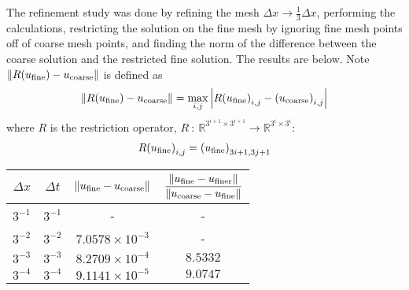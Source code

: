 \documentclass{article} %
\theoremstyle{plain}
\newcommand{\Dx}{\Delta x}
\newcommand{\Dt}{\Delta t}
\numberwithin{equation}{section} %
\numberwithin{figure}{section} %
\numberwithin{table}{section} %
\begin{document}
\begin{enumerate}[\ \ (a)]
\begin{figure}[ht!]
        \end{figure}
        \FloatBarrier
        The refinement study was done by refining the mesh $\Dx \rightarrow \frac{1}{3}\Dx$, performing the calculations, restricting the solution on the fine mesh by ignoring fine mesh points off of coarse mesh points, and finding the norm of the difference between the coarse solution and the restricted fine solution.  The results are below.  Note $\norm{R\qty(u_\text{fine}) - u_\text{coarse}}$ is defined as
        \begin{align*}
            \norm{R\qty(u_\text{fine}) - u_\text{coarse}} = \max_{i,j}\abs{R\qty(u_\text{fine})_{i,j} - \qty(u_\text{coarse})_{i,j}}
        \end{align*}
        where $R$ is the restriction operator, $R\ :\ \mathbb{R}^{3^{i+1}\times3^{i+1}} \rightarrow \mathbb{R}^{3^i\times3^i}$:
        \begin{align*}
            R\qty(u_\text{fine})_{i,j} = \qty(u_\text{fine})_{3i+1,3j+1}
        \end{align*}
        \begin{table}[ht!]
            \centering
            \begin{tabular}{||c|c|c|c||}\hline\hline
            $\Dx$ & $\Dt$ & $\norm{u_\text{fine} - u_\text{coarse}}$ & $\dfrac{\norm{u_\text{fine} - u_\text{finer}}}{\norm{u_\text{coarse} - u_\text{fine}}}$\\\hline\hline
            $3^{-1}$ & $3^{-1}$ & - & - \\\hline
            $3^{-2}$ & $3^{-2}$ & $7.0578\times10^{-3}$ & -\\\hline
            $3^{-3}$ & $3^{-3}$ & $8.2709\times10^{-4}$ & $8.5332$ \\\hline
            $3^{-4}$ & $3^{-4}$ & $9.1141\times10^{-5}$ & $9.0747$ \\\hline

\end{tabular}
\end{table}
\end{enumerate}
\end{document}
